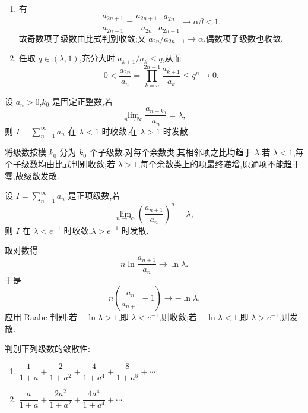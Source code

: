 \begin{solution}
    \leavevmode
    \begin{enumerate}
        \item 有
              \[
                  \dfrac{a_{2n+1}}{a_{2n-1}}
                  =\dfrac{a_{2n+1}}{a_{2n}}\dfrac{a_{2n}}{a_{2n-1}}
                  \longrightarrow\alpha\beta<1.
              \]
              故奇数项子级数由比式判别收敛;又 $a_{2n}/a_{2n-1}\to\alpha$,偶数项子级数也收敛.
        \item 任取 $q\in(\lambda,1)$,充分大时 $a_{k+1}/a_k\leq q$,从而
              \[
                  0<\dfrac{a_{2n}}{a_n}=\prod\limits_{k=n}^{2n-1}\dfrac{a_{k+1}}{a_k}
                  \leq q^n\longrightarrow0.
              \]
    \end{enumerate}
\end{solution}

\begin{example}
    设 $a_n>0$,$k_0$ 是固定正整数,若
    \[
        \displaystyle\lim\limits_{n\to\infty}\dfrac{a_{n+k_0}}{a_n}=\lambda,
    \]
    则 $\displaystyle I=\sum\limits_{n=1}^{\infty}a_n$ 在 $\lambda<1$ 时收敛,在 $\lambda>1$ 时发散.
\end{example}
\exampleblank

\begin{solution}
    将级数按模 $k_0$ 分为 $k_0$ 个子级数.对每个余数类,其相邻项之比均趋于 $\lambda$.若 $\lambda<1$,每个子级数均由比式判别收敛;若 $\lambda>1$,每个余数类上的项最终递增,原通项不能趋于零,故级数发散.
\end{solution}

\begin{example}
    设 $\displaystyle I=\sum\limits_{n=1}^{\infty}a_n$ 是正项级数,若
    \[
        \displaystyle\lim\limits_{n\to\infty}\left(\dfrac{a_{n+1}}{a_n}\right)^n=\lambda,
    \]
    则 $I$ 在 $\lambda<e^{-1}$ 时收敛,$\lambda>e^{-1}$ 时发散.
\end{example}
\exampleblank

\begin{solution}
    取对数得
    \[
        n\ln\dfrac{a_{n+1}}{a_n}\longrightarrow\ln\lambda.
    \]
    于是
    \[
        n\left(\dfrac{a_n}{a_{n+1}}-1\right)
        \longrightarrow-\ln\lambda.
    \]
    应用 Raabe 判别:若 $-\ln\lambda>1$,即 $\lambda<e^{-1}$,则收敛;若
    $-\ln\lambda<1$,即 $\lambda>e^{-1}$,则发散.
\end{solution}

\begin{example}
    判别下列级数的敛散性:
    \begin{enumerate}
        \item $\displaystyle\dfrac{1}{1+a}+\dfrac{2}{1+a^2}+\dfrac{4}{1+a^4}+\dfrac{8}{1+a^8}+\cdots$;
        \item $\displaystyle\dfrac{a}{1+a}+\dfrac{2a^2}{1+a^2}+\dfrac{4a^4}{1+a^4}+\cdots$.
    \end{enumerate}
\end{example}
\exampleblank

